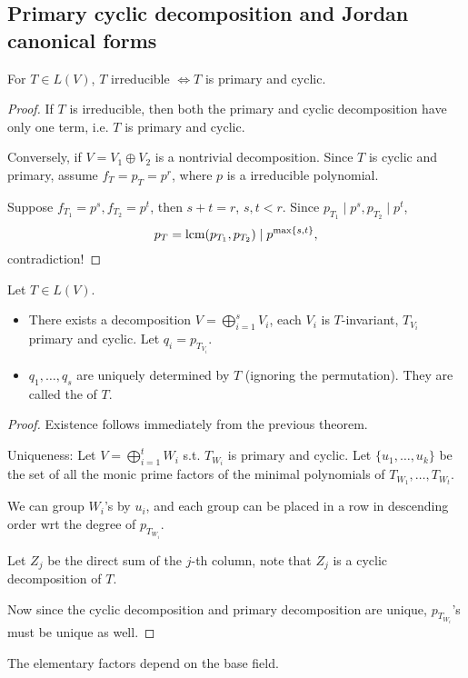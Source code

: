\subsection{Primary cyclic decomposition and Jordan canonical forms}
\label{sub:Primary cyclic decomposition}

\begin{theorem}
    For $T\in L(V)$, $T$ irreducible $\iff T$ is primary and cyclic.
\end{theorem}
\begin{proof}[Proof]
    If $T$ is irreducible, then both the primary and cyclic decomposition
	have only one term, i.e. $T$ is primary and cyclic.

	Conversely, if $V = V_1\oplus V_2$ is a nontrivial decomposition.
	Since $T$ is cyclic and primary, assume $f_T = p_T = p^r$,
	where $p$ is a irreducible polynomial.

	Suppose $f_{T_1} = p^s, f_{T_2} = p^t$, then $s + t = r$, $s,t < r$.
	Since $p_{T_1}\mid p^s, p_{T_2}\mid p^t$,
	\[
	p_T = \operatorname{lcm}(p_{T_1}, p_{T_2}) \mid p^{\max\{s, t\}},
	\]
	contradiction!
\end{proof}

\begin{theorem}
    Let $T\in L(V)$.
	\begin{itemize}
		\item There exists a decomposition $V = \bigoplus_{i=1}^s V_i$,
			each $V_i$ is $T$-invariant, $T_{V_i}$ primary and cyclic.
			Let $q_i = p_{T_{V_i}}$.
		\item $q_1,\dots,q_s$ are uniquely determined by $T$ (ignoring the permutation).
			They are called the  of $T$.
	\end{itemize}
\end{theorem}
\begin{proof}[Proof]
    Existence follows immediately from the previous theorem.

	Uniqueness: Let $V = \bigoplus_{i=1}^t W_i$ s.t. $T_{W_i}$ is primary and cyclic.
	Let $\{u_1,\dots, u_k\}$ be the set of all the monic prime factors of
	the minimal polynomials of $T_{W_1},\dots,T_{W_t}$.

	We can group $W_i$'s by $u_i$, and each group can be placed in a row
	in descending order wrt the degree of $p_{T_{W_i}}$.

	Let $Z_j$ be the direct sum of the $j$-th column, note that $Z_j$ is
	a cyclic decomposition of $T$.

	Now since the cyclic decomposition and primary decomposition are unique,
	$p_{T_{W_i}}$'s must be unique as well.
\end{proof}
\begin{remark}
    The elementary factors depend on the base field.
\end{remark}

